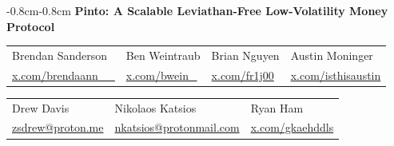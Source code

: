 \documentclass[tikz]{article}
\newcommand{\PintoCover}{} %
\renewcommand{\PintoCover}{\usebox{\cachePintoCover}}
\begin{document}
\thispagestyle{empty} %
\begin{titlepage}
    \begin{center}
        \vspace*{-0.1cm}
        \begin{changemargin}{-0.8cm}{-0.8cm}
            \centering %
            \textbf{\Large{Pinto: A Scalable Leviathan-Free Low-Volatility Money Protocol}}
        \end{changemargin}

        
        \begin{center}
            \PintoCover
        \end{center}


        \begin{center}
            \begin{tabular}{>{\centering\arraybackslash}p{3.2cm} >{\centering\arraybackslash}p{3.2cm} >{\centering\arraybackslash}p{3.2cm} >{\centering\arraybackslash}p{3.2cm}}
                Brendan Sanderson & Ben Weintraub & Brian Nguyen & Austin Moninger \\
                \href{https://x.com/brendaann__}{\normalsize{x.com/brendaann\_\_}} & \href{https://x.com/bwein_}{\normalsize{x.com/bwein\_}} & \href{https://x.com/fr1j00}{\normalsize{x.com/fr1j00}} & \href{https://x.com/isthisaustin}{\normalsize{x.com/isthisaustin}}
            \end{tabular}
        \end{center}
        
        \vspace*{-0.52cm}

        \begin{center}
            \begin{tabular}{>{\centering\arraybackslash}p{4.6cm} >{\centering\arraybackslash}p{4.6cm} >{\centering\arraybackslash}p{4.6cm}}
                Drew Davis & Nikolaos Katsios & Ryan Ham \\
                \href{mailto:zsdrew@proton.me}{\normalsize{zsdrew@proton.me}} & \href{mailto:nkatsios@protonmail.com}{\normalsize{nkatsios@protonmail.com}} & \href{https://x.com/gkaehddls}{\normalsize{x.com/gkaehddls}}
            \end{tabular}
        \end{center}


\end{center}
\end{titlepage}
\end{document}
